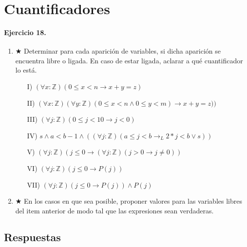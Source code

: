 \documentclass[a4paper]{article}
\begin{document}
\section{Cuantificadores}

\paragraph{\textbf{Ejercicio 18.}}
\begin{enumerate}[label=\alph*)]
\item $\bigstar$ Determinar para cada aparición de variables, si dicha aparición se encuentra libre o ligada. En caso de estar ligada, aclarar a qué cuantificador lo está.
\begin{itemize}
\item[I)] $( \forall x:\mathbb{Z})(0\leq x < n \rightarrow x+y=z)$
\item[II)] $( \forall x:\mathbb{Z})( \forall y:\mathbb{Z})(0\leq x < n \wedge 0\leq y <m)\rightarrow x+y=z)) $
\item[III)] $( \forall j:\mathbb{Z})(0 \leq j < 10 \rightarrow j < 0) $
\item[IV)] $ s\wedge a < b-1 \wedge (( \forall j:\mathbb{Z})(a \leq j < b \rightarrow _L 2*j<b\vee s))$
\item[V)] $ ( \forall j:\mathbb{Z})(j \leq 0 \rightarrow ( \forall j:\mathbb{Z})(j>0 \rightarrow j \neq 0))$
\item[VI)] $ ( \forall j:\mathbb{Z})(j \leq 0 \rightarrow P(j))$
\item[VII)] $ ( \forall j:\mathbb{Z})(j \leq 0 \rightarrow P(j))\wedge P(j)$
\end{itemize}
\item $\bigstar$ En los casos en que sea posible, proponer valores para las variables libres del item anterior de modo tal que las expresiones sean verdaderas.
\end{enumerate}

\subsection*{Respuestas}
\end{document}

